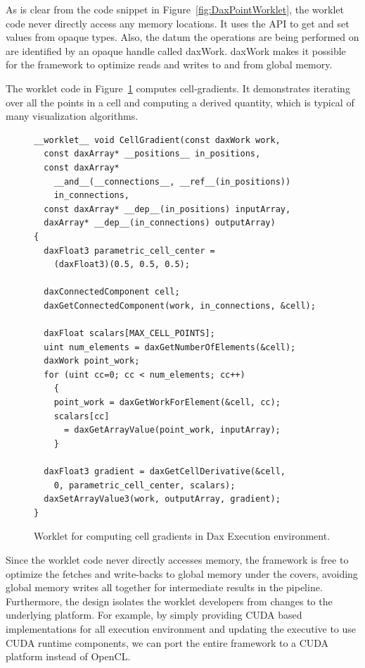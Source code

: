 \documentclass{vgtc}                          %
\begin{document}
As is clear from the code snippet in Figure~\ref{fig:DaxPointWorklet}, the worklet code never directly access
any memory locations. It uses the API to get and set values from opaque types. Also,
the datum the operations are being performed on are identified by an opaque
handle called daxWork. daxWork makes it possible for the framework to optimize
reads and writes to and from global memory.

The worklet code in Figure~\ref{fig:DaxCellGradientWorklet} computes cell-gradients. It demonstrates
iterating over all the points in a cell and computing a derived quantity, which
is typical of many visualization algorithms.

\begin{figure}[htbp]
\centering
\begin{lstlisting}[language=Dax]
__worklet__ void CellGradient(const daxWork work,
  const daxArray* __positions__ in_positions,
  const daxArray*
    __and__(__connections__, __ref__(in_positions))
    in_connections,
  const daxArray* __dep__(in_positions) inputArray,
  daxArray* __dep__(in_connections) outputArray)
{
  daxFloat3 parametric_cell_center =
    (daxFloat3)(0.5, 0.5, 0.5);

  daxConnectedComponent cell;
  daxGetConnectedComponent(work, in_connections, &cell);

  daxFloat scalars[MAX_CELL_POINTS];
  uint num_elements = daxGetNumberOfElements(&cell);
  daxWork point_work;
  for (uint cc=0; cc < num_elements; cc++)
    {
    point_work = daxGetWorkForElement(&cell, cc);
    scalars[cc]
      = daxGetArrayValue(point_work, inputArray);
    }

  daxFloat3 gradient = daxGetCellDerivative(&cell,
    0, parametric_cell_center, scalars);
  daxSetArrayValue3(work, outputArray, gradient);
}
\end{lstlisting}
\caption{Worklet for computing cell gradients in Dax Execution environment.}
\label{fig:DaxCellGradientWorklet}
\end{figure}

Since the worklet code never directly accesses memory, the framework is free to
optimize the fetches and write-backs to global memory under the covers, avoiding
global memory writes all together for intermediate results in the pipeline.
Furthermore, the design isolates the worklet developers from changes to the
underlying platform. For example, by simply providing CUDA based implementations
for all execution environment and updating the executive to use CUDA runtime components, we
can port the entire framework to a CUDA platform instead of OpenCL.
\end{document}
